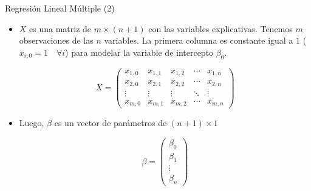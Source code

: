 \documentclass[handout]{beamer}
\begin{document}
\begin{frame}{Regresión Lineal Múltiple (2)}
\scriptsize{
\begin{itemize} 
\item $X$ es una matriz de $m \times (n+1)$ con las variables explicativas. Tenemos $m$ observaciones de las $n$ variables. La primera columna es constante igual a $1$ ($x_{i,0}=1 \quad \forall i$) para modelar la variable de intercepto $\beta_0$.

\begin{displaymath}
 X =
 \begin{pmatrix}
x_{1,0} &  x_{1,1} & x_{1,2} & \cdots & x_{1,n} \\
x_{2,0} &  x_{2,1} & x_{2,2} & \cdots & x_{2,n} \\
\vdots  &  \vdots  & \vdots  & \ddots & \vdots  \\
x_{m,0} &  x_{m,1} & x_{m,2} & \cdots & x_{m,n}
 \end{pmatrix}
\end{displaymath}

 \item Luego, $\beta$ es un vector de parámetros de $(n+1) \times 1$

\begin{displaymath}
 \beta =
 \begin{pmatrix}
  \beta_{0}  \\
  \beta_{1}  \\
  \vdots    \\
  \beta_{n} 
 \end{pmatrix}
\end{displaymath}





\end{itemize}
 

}
\end{frame}
\end{document}
